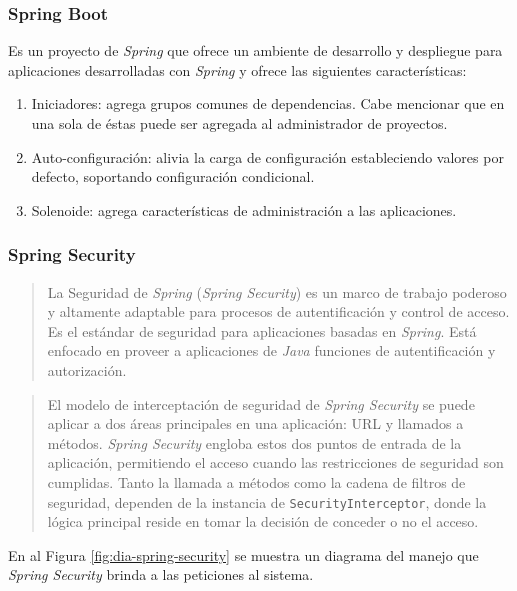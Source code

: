 \subsubsection{Spring Boot}\label{sec:spring-boot}
Es un proyecto de \textit{Spring} que ofrece un ambiente de desarrollo y despliegue para aplicaciones desarrolladas con \textit{Spring} y ofrece las siguientes características\cite{SpringBootInAction}:
\begin{enumerate}
	\item Iniciadores: agrega grupos comunes de dependencias. Cabe mencionar que en una sola de éstas puede ser agregada al administrador de proyectos.
	\item Auto-configuración: alivia la carga de configuración estableciendo valores por defecto, soportando configuración condicional.
	\item Solenoide: agrega características de administración a las aplicaciones.
\end{enumerate}

\subsubsection{Spring Security}\label{sec:spring-security}
\begin{quote}
	La Seguridad de \textit{Spring} (\textit{Spring Security}) es un marco de trabajo poderoso y altamente adaptable para procesos de autentificación y control de acceso. Es el estándar de seguridad para aplicaciones basadas en \textit{Spring}. Está enfocado en proveer a aplicaciones de \textit{Java} funciones de autentificación y autorización\cite{SpringSecurity}.
\end{quote}

\begin{quote}
	El modelo de interceptación de seguridad de \textit{Spring Security} se puede aplicar a dos áreas principales en una aplicación: URL y llamados a métodos. \textit{Spring Security} engloba estos dos puntos de entrada de la aplicación, permitiendo el acceso cuando las restricciones de seguridad son cumplidas. Tanto la llamada a métodos como la cadena de filtros de seguridad, dependen de la instancia de \texttt{SecurityInterceptor}, donde la lógica principal reside en tomar la decisión de conceder o no el acceso\cite{ProSpringSecurity}.
\end{quote}
En al Figura \ref{fig:dia-spring-security} se muestra un diagrama del manejo que \textit{Spring Security} brinda a las peticiones al sistema.

